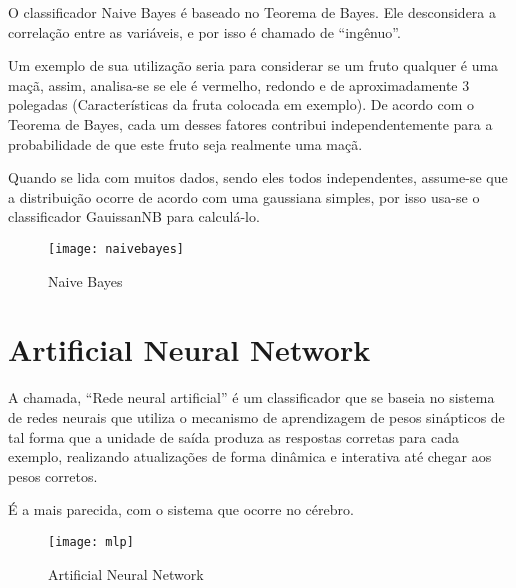 O classificador Naive Bayes é baseado no Teorema de Bayes. Ele desconsidera a correlação entre as variáveis, e por isso é chamado de “ingênuo”.

Um exemplo de sua utilização seria para considerar se um fruto qualquer é uma maçã, assim, analisa-se se ele é vermelho, redondo e de aproximadamente 3 polegadas (Características da fruta colocada em exemplo). De acordo com o Teorema de Bayes, cada um desses fatores contribui independentemente para a probabilidade de que este fruto seja realmente uma maçã.

Quando se lida com muitos dados, sendo eles todos independentes, assume-se que a distribuição ocorre de acordo com uma gaussiana simples, por isso usa-se o classificador GauissanNB para calculá-lo.


\begin{figure}[!htb]
\begin{center}
\caption{Naive Bayes}
\texttt{[image: naivebayes]}
\end{center}
\end{figure}


\section{\textbf{Artificial Neural Network}}

A chamada, “Rede neural artificial” é um classificador que se baseia no sistema de redes neurais que utiliza o mecanismo de aprendizagem de pesos sinápticos de tal forma que a unidade de saída produza as respostas corretas para cada exemplo, realizando atualizações de forma dinâmica e interativa até chegar aos pesos corretos.

É a mais parecida, com o sistema que ocorre no cérebro.


\begin{figure}[!htb]
\begin{center}
\caption{Artificial Neural Network}
\texttt{[image: mlp]}
\end{center}
\end{figure}


